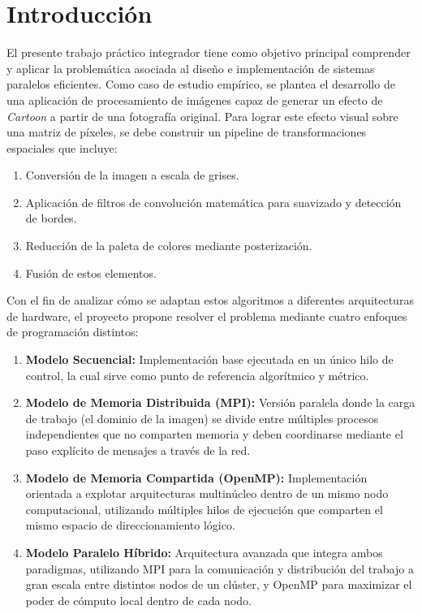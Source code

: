\chapter{Introducción}

El presente trabajo práctico integrador tiene como objetivo principal comprender y aplicar la problemática asociada al diseño e implementación de sistemas paralelos eficientes. Como caso de estudio empírico, se plantea el desarrollo de una aplicación de procesamiento de imágenes capaz de generar un efecto de \textit{Cartoon} a partir de una fotografía original. Para lograr este efecto visual sobre una matriz de píxeles, se debe construir un pipeline de transformaciones espaciales que incluye:
\begin{enumerate}
    \item Conversión de la imagen a escala de grises.
    \item Aplicación de filtros de convolución matemática para suavizado y detección de bordes.
    \item Reducción de la paleta de colores mediante posterización.
    \item Fusión de estos elementos.
\end{enumerate}


Con el fin de analizar cómo se adaptan estos algoritmos a diferentes arquitecturas de hardware, el proyecto propone resolver el problema mediante cuatro enfoques de programación distintos:

\begin{enumerate}
    \item \textbf{Modelo Secuencial:} Implementación base ejecutada en un único hilo de control, la cual sirve como punto de referencia algorítmico y métrico.
    
    \item \textbf{Modelo de Memoria Distribuida (MPI):} Versión paralela donde la carga de trabajo (el dominio de la imagen) se divide entre múltiples procesos independientes que no comparten memoria y deben coordinarse mediante el paso explícito de mensajes a través de la red.
    
    \item \textbf{Modelo de Memoria Compartida (OpenMP):} Implementación orientada a explotar arquitecturas multinúcleo dentro de un mismo nodo computacional, utilizando múltiples hilos de ejecución que comparten el mismo espacio de direccionamiento lógico.
    
    \item \textbf{Modelo Paralelo Híbrido:} Arquitectura avanzada que integra ambos paradigmas, utilizando MPI para la comunicación y distribución del trabajo a gran escala entre distintos nodos de un clúster, y OpenMP para maximizar el poder de cómputo local dentro de cada nodo.
\end{enumerate}

